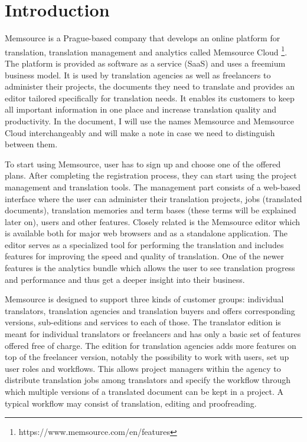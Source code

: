
\chapter{Introduction}

Memsource is a Prague-based company that develops an online platform for translation, translation management and analytics called Memsource Cloud \footnote{https://www.memsource.com/en/features}. The platform is provided as software as a service (SaaS) and uses a freemium business model. It is used by translation agencies as well as freelancers to administer their projects, the documents they need to translate and provides an editor tailored specifically for translation needs. It enables its customers to keep all important information in one place and increase translation quality and productivity. In the document, I will use the names Memsource and Memsource Cloud interchangeably and will make a note in case we need to distinguish between them.

To start using Memsource, user has to sign up and choose one of the offered plans. After completing the registration process, they can start using the project management and translation tools. The management part consists of a web-based interface where the user can administer their translation projects, jobs (translated documents), translation memories and term bases (these terms will be explained later on), users and other features. Closely related is the Memsource editor which is available both for major web browsers and as a standalone application. The editor serves as a specialized tool for performing the translation and includes features for improving the speed and quality of translation. One of the newer features is the analytics bundle which allows the user to see translation progress and performance and thus get a deeper insight into their business.

Memsource is designed to support three kinds of customer groups: individual translators, translation agencies and translation buyers and offers corresponding versions, sub-editions and services to each of those.
The translator edition is meant for individual translators or freelancers and has only a basic set of features offered free of charge. The edition for translation agencies adds more features on top of the freelancer version, notably the possibility to work with users, set up user roles and workflows. This allows project managers within the agency to distribute translation jobs among translators and specify the workflow through which multiple versions of a translated document can be kept in a project. A typical workflow may consist of translation, editing and proofreading.


